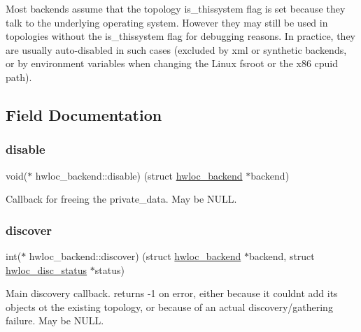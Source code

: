 Most backends assume that the topology is\+\_\+thissystem flag is set because they talk to the underlying operating system. However they may still be used in topologies without the is\+\_\+thissystem flag for debugging reasons. In practice, they are usually auto-\/disabled in such cases (excluded by xml or synthetic backends, or by environment variables when changing the Linux fsroot or the x86 cpuid path). 

\subsection{Field Documentation}
\mbox{\label{a00374_a36c4fa86350525b46340c67b802c69c7}} 
\subsubsection{\texorpdfstring{disable}{disable}}
{\footnotesize\ttfamily void($\ast$ hwloc\+\_\+backend\+::disable) (struct \hyperlink{a00374}{hwloc\+\_\+backend} $\ast$backend)}



Callback for freeing the private\+\_\+data. May be N\+U\+LL. 

\mbox{\label{a00374_accff2cd8404be43c3b44cec05e6f609b}} 
\subsubsection{\texorpdfstring{discover}{discover}}
{\footnotesize\ttfamily int($\ast$ hwloc\+\_\+backend\+::discover) (struct \hyperlink{a00374}{hwloc\+\_\+backend} $\ast$backend, struct \hyperlink{a00370}{hwloc\+\_\+disc\+\_\+status} $\ast$status)}



Main discovery callback. returns -\/1 on error, either because it couldn\textquotesingle{}t add its objects ot the existing topology, or because of an actual discovery/gathering failure. May be N\+U\+LL. 

\mbox{\label{a00374_aaa8eafe495aadd81c2e3c4ec527c10ba}} 
